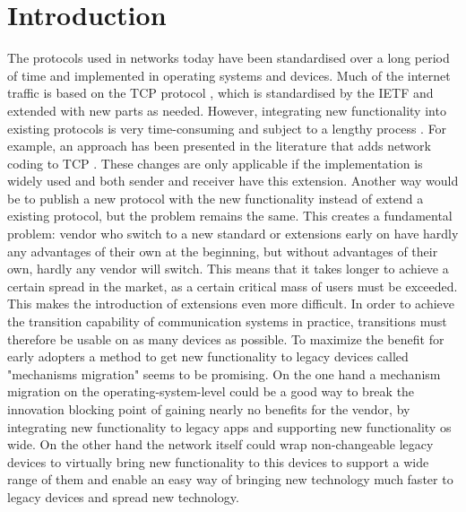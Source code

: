 \section{Introduction}
\label{sec:intro}

The protocols used in networks today have been standardised over a long period of time and implemented in operating systems and devices.
Much of the internet traffic is based on the TCP protocol \cite{A3:john2007analysis}, which is standardised by the IETF and extended with new parts as needed. 
However, integrating new functionality into existing protocols is very time-consuming and subject to a lengthy process \cite{A3:de2019pluginizing}. 
For example, an approach has been presented in the literature that adds network coding to TCP \cite{A3:sundararajan2011network}. 
These changes are only applicable if the implementation is widely used and both sender and receiver have this extension. 
Another way would be to publish a new protocol with the new functionality instead of extend a existing protocol, but the problem remains the same. 
This creates a fundamental problem: vendor who switch to a new standard or extensions early on have hardly any advantages of their own at the beginning, but without advantages of their own, hardly any vendor will switch.
This means that it takes longer to achieve a certain spread in the market, as a certain critical mass of users must be exceeded. 
This makes the introduction of extensions even more difficult.
In order to achieve the transition capability of communication systems in practice, transitions must therefore be usable on as many devices as possible.
To maximize the benefit for early adopters a method to get new functionality to legacy devices called  "mechanisms migration" seems to be promising.
On the one hand a mechanism migration on the operating-system-level could be a good way to break the innovation blocking point of gaining nearly no benefits for the vendor, by integrating new functionality to legacy apps and supporting new functionality os wide.
On the other hand the network itself could wrap non-changeable legacy devices to virtually bring new functionality to this devices to support a wide range of them and enable an easy way of bringing new technology much faster to legacy devices and spread new technology. 

